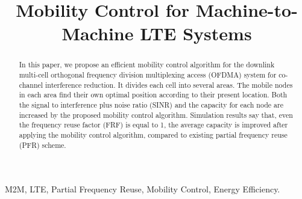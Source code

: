 \documentclass[conference]{IEEEtran}
\begin{document}
\title{Mobility Control for Machine-to-Machine LTE Systems}


\author{
 }


































\maketitle


\begin{abstract}

In this paper, we propose an efficient mobility control algorithm for the downlink multi-cell orthogonal frequency division multiplexing access (OFDMA) system for co-channel interference reduction. It divides each cell into several areas. The mobile nodes in each area find their own optimal position according to their present location. Both the signal to interference plus noise ratio (SINR) and the capacity for each node are increased by the proposed mobility control algorithm. Simulation results say that, even the frequency reuse factor (FRF) is equal to 1, the average capacity is improved after applying the mobility control algorithm, compared to existing partial frequency reuse (PFR) scheme.

\end{abstract}


\begin{keywords}
M2M, LTE, Partial Frequency Reuse, Mobility Control, Energy Efficiency.
\end{keywords}
\end{document}
